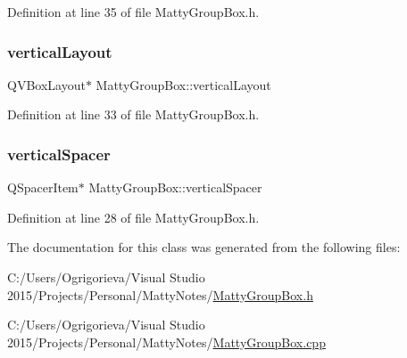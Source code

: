 Definition at line 35 of file Matty\+Group\+Box.\+h.

\hypertarget{classMattyGroupBox_a2fc280283ef68a61828fe26007c949f1}{}\label{classMattyGroupBox_a2fc280283ef68a61828fe26007c949f1} 
\subsubsection{\texorpdfstring{vertical\+Layout}{verticalLayout}}
{\footnotesize\ttfamily Q\+V\+Box\+Layout$\ast$ Matty\+Group\+Box\+::vertical\+Layout\hspace{0.3cm}{\ttfamily [private]}}



Definition at line 33 of file Matty\+Group\+Box.\+h.

\hypertarget{classMattyGroupBox_ae622d8330b00272995af1d41ce037b4c}{}\label{classMattyGroupBox_ae622d8330b00272995af1d41ce037b4c} 
\subsubsection{\texorpdfstring{vertical\+Spacer}{verticalSpacer}}
{\footnotesize\ttfamily Q\+Spacer\+Item$\ast$ Matty\+Group\+Box\+::vertical\+Spacer\hspace{0.3cm}{\ttfamily [private]}}



Definition at line 28 of file Matty\+Group\+Box.\+h.



The documentation for this class was generated from the following files\+:\begin{DoxyCompactItemize}
\item 
C\+:/\+Users/\+Ogrigorieva/\+Visual Studio 2015/\+Projects/\+Personal/\+Matty\+Notes/\hyperlink{MattyGroupBox_8h}{Matty\+Group\+Box.\+h}\item 
C\+:/\+Users/\+Ogrigorieva/\+Visual Studio 2015/\+Projects/\+Personal/\+Matty\+Notes/\hyperlink{MattyGroupBox_8cpp}{Matty\+Group\+Box.\+cpp}\end{DoxyCompactItemize}
